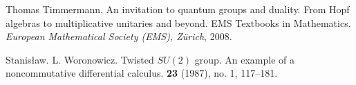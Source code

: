 \documentclass[11pt, reqno, a4paper, final]{amsart}
\theoremstyle{plain}
\theoremstyle{definition}
\begin{document}
\begin{thebibliography}{CdlH16}
Thomas Timmermann.
\newblock An invitation to quantum groups and duality. From Hopf algebras to multiplicative
unitaries and beyond.
\newblock EMS Textbooks in Mathematics. {\em European Mathematical Society (EMS), Z\"urich}, 2008. 

Stanis\l aw. L. Woronowicz.
\newblock Twisted $SU(2)$ group. An example of a noncommutative differential calculus.
 {\bf 23} (1987), no. 1, 117--181. 
\end{thebibliography}
\end{document}

